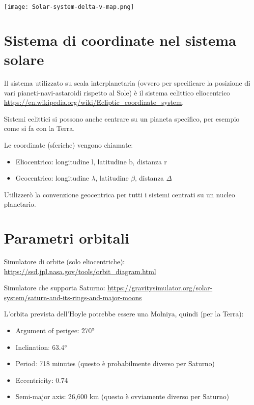 \documentclass[a4paper,10pt,openany,oneside]{memoir}
\begin{document}
\texttt{[image: Solar-system-delta-v-map.png]}

\section{Sistema di coordinate nel sistema solare}

Il sistema utilizzato su scala interplanetaria (ovvero per specificare la posizione di vari pianeti-navi-astaroidi rispetto al Sole) è il sistema eclittico eliocentrico \url{https://en.wikipedia.org/wiki/Ecliptic_coordinate_system}.

Sistemi eclittici si possono anche centrare su un pianeta specifico, per esempio come si fa con la Terra.

Le coordinate (sferiche) vengono chiamate:

\begin{itemize}

  \item Eliocentrico: longitudine l, latitudine b, distanza r
  \item Geocentrico: longitudine $\lambda$, latitudine $\beta$, distanza $\Delta$

\end{itemize}

Utilizzerò la convenzione geocentrica per tutti i sistemi centrati su un nucleo planetario.


\section{Parametri orbitali}

Simulatore di orbite (solo eliocentriche): \url{https://ssd.jpl.nasa.gov/tools/orbit_diagram.html}

Simulatore che supporta Saturno: \url{https://gravitysimulator.org/solar-system/saturn-and-its-rings-and-major-moons}

L'orbita prevista dell'Hoyle potrebbe essere una Molniya, quindi (per la Terra):
\begin{itemize}
\item Argument of perigee: 270°
\item Inclination: 63.4°
\item Period: 718 minutes (questo è probabilmente diverso per Saturno)
\item Eccentricity: 0.74
\item Semi-major axis: 26,600 km (questo è ovviamente diverso per Saturno)
\end{itemize}
\end{document}
